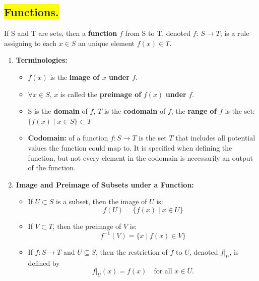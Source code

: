 \subsection*{\colorbox{yellow}{Functions.}}
\qquad If S and T are sets, then a \textbf{function} $f$ from S to T, denoted \(f: \, S \rightarrow T\), is a rule assigning to each $x \in S$ an unique element $f(x)\in T$. 
    \begin{enumerate}
        \item \textbf{Terminologies:}
            \begin{itemize}
                \item $f(x)$ is the \textbf{image of $x$ under $f$}.
                \item \(\forall x \in S \), \( x \) is called the \textbf{preimage of } \( f(x) \) \textbf{ under } \( f \).
                \item S is the \textbf{domain} of $f$, $T$ is the \textbf{codomain} of $f$, the \textbf{range of $f$} is the set:
                    \(\{f(x) \mid x \in S\} \subset T\)
                \item \textbf{Codomain:} of a function  $f: S \rightarrow T$  is the set  $T$  that includes all potential values the function could map to. It is specified when defining the function, but not every element in the codomain is necessarily an output of the function.
                \end{itemize}
        \item \textbf{Image and Preimage of Subsets under a Function:}
                \begin{itemize}
                    \item If $U \subset S$ is a subset, then the image of $U$ is:
                        \[ f(U) = \{f(x) \mid x \in U\}\]
                    \item If $V \subset T$, then the preimage of $V$ is:
                        \[ f^{-1}(V) = \{x \mid f(x) \in V\}\]
                    \item If \( f: S \rightarrow T \) and \( U \subseteq S \), then the restriction of \( f \) to \( U \), denoted \( f|_U \), is defined by
                        \[ f|_U(x) = f(x) \quad \text{for all } x \in U. \]
                \end{itemize}
            \vspace{-0.8cm}

\end{enumerate}
